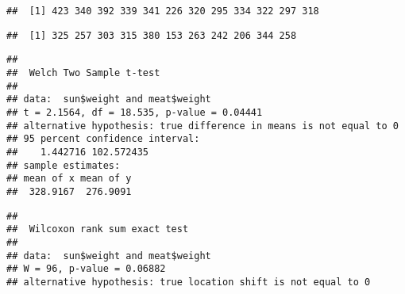\documentclass[
]{article}
\newenvironment{Shaded}{\begin{snugshade}}{\end{snugshade}}
\newcommand{\FunctionTok}[1]{\textcolor[rgb]{0.00,0.00,0.00}{#1}}
\newcommand{\NormalTok}[1]{#1}
\newcommand{\OtherTok}[1]{\textcolor[rgb]{0.56,0.35,0.01}{#1}}
\newcommand{\SpecialCharTok}[1]{\textcolor[rgb]{0.00,0.00,0.00}{#1}}
\newcommand{\StringTok}[1]{\textcolor[rgb]{0.31,0.60,0.02}{#1}}
\begin{document}
\begin{Shaded}
\end{Shaded}

\begin{verbatim}
##  [1] 423 340 392 339 341 226 320 295 334 322 297 318
\end{verbatim}

\begin{verbatim}
##  [1] 325 257 303 315 380 153 263 242 206 344 258
\end{verbatim}

\begin{Shaded}
\end{Shaded}

\begin{verbatim}
## 
##  Welch Two Sample t-test
## 
## data:  sun$weight and meat$weight
## t = 2.1564, df = 18.535, p-value = 0.04441
## alternative hypothesis: true difference in means is not equal to 0
## 95 percent confidence interval:
##    1.442716 102.572435
## sample estimates:
## mean of x mean of y 
##  328.9167  276.9091
\end{verbatim}

\begin{Shaded}
\end{Shaded}

\begin{verbatim}
## 
##  Wilcoxon rank sum exact test
## 
## data:  sun$weight and meat$weight
## W = 96, p-value = 0.06882
## alternative hypothesis: true location shift is not equal to 0
\end{verbatim}
\end{document}
